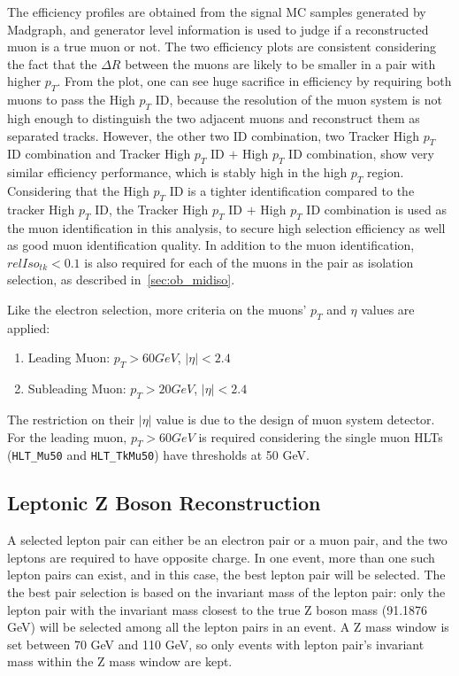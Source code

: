 \vspace{0.3cm}
The efficiency profiles are obtained from the signal MC samples generated by Madgraph, and generator level information is used to judge if a reconstructed muon is a true muon or not. The two efficiency plots are consistent considering the fact that the $\Delta R$ between the muons are likely to be smaller in a pair with higher $p_T$. From the plot, one can see huge sacrifice in efficiency by requiring both muons to pass the High $p_T$ ID, because the resolution of the muon system is not high enough to distinguish the two adjacent muons and reconstruct them as separated tracks. However, the other two ID combination, two Tracker High $p_T$ ID combination and Tracker High $p_T$ ID $+$ High $p_T$ ID combination, show very similar efficiency performance, which is stably high in the high $p_T$ region. Considering that the High $p_T$ ID is a tighter identification compared to the tracker High $p_T$ ID, the Tracker High $p_T$ ID $+$ High $p_T$ ID combination is used as the muon identification in this analysis, to secure high selection efficiency as well as good muon identification quality. In addition to the muon identification, $relIso_{tk}<0.1$ is also required for each of the muons in the pair as isolation selection, as described in~\ref{sec:ob_midiso}.

\vspace{0.3cm}
Like the electron selection, more criteria on the muons' $p_T$ and $\eta$ values are applied:
\begin{enumerate}
\item Leading Muon: $p_T >60 GeV$, $|\eta|<2.4$
\item Subleading Muon: $p_T >20 GeV$, $|\eta|<2.4$
\end{enumerate}

The restriction on their $|\eta|$ value is due to the design of muon system detector. For the leading muon, $p_T >60 GeV$ is required considering the single muon HLTs (\texttt{HLT\_Mu50} and \texttt{HLT\_TkMu50}) have thresholds at 50 GeV.

\subsection{Leptonic Z Boson Reconstruction}
A selected lepton pair can either be an electron pair or a muon pair, and the two leptons are required to have opposite charge. In one event, more than one such lepton pairs can exist, and in this case, the best lepton pair will be selected. The the best pair selection is based on the invariant mass of the lepton pair: only the lepton pair with the invariant mass closest to the true Z boson mass (91.1876 GeV) will be selected among all the lepton pairs in an event. A Z mass window is set between 70 GeV and 110 GeV, so only events with lepton pair's invariant mass within the Z mass window are kept.

